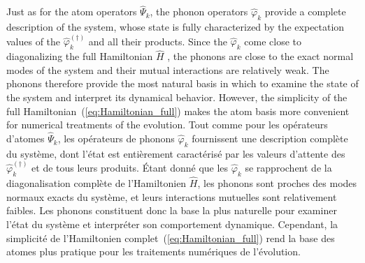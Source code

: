 \documentclass[aps,prd,notitlepage,amsfonts,amssymb,amsmath,nofootinbib,superscriptaddress,longbibliography]{revtex4-2}
\newcommand{\trad}[1]{\textcolor{tradcolor}{#1}}
\begin{document}
Just as for the atom operators $\hat{\Psi}_{k}$, the phonon operators $\hat{\varphi}_{k}$ provide a complete description of the system, whose state is fully characterized by the expectation values of the $\hat{\varphi}_{k}^{(\dagger)}$ and all their products.  Since the $\hat{\varphi}_{k}$ come close to diagonalizing the full Hamiltonian $\hat{H}$ , the phonons are close to the exact normal modes of the system and their mutual interactions are relatively weak.  The phonons therefore provide the most natural basis in which to examine the state of the system and interpret its dynamical behavior.  However, the simplicity of the full Hamiltonian~(\ref{eq:Hamiltonian_full}) makes the atom basis more convenient for numerical treatments of the evolution.
\trad{
Tout comme pour les opérateurs d'atomes $\hat{\Psi}_{k}$, les opérateurs de phonons $\hat{\varphi}_{k}$ fournissent une description complète du système, dont l'état est entièrement caractérisé par les valeurs d'attente des $\hat{\varphi}_{k}^{(\dagger)}$ et de tous leurs produits. Étant donné que les $\hat{\varphi}_{k}$ se rapprochent de la diagonalisation complète de l'Hamiltonien $\hat{H}$, les phonons sont proches des modes normaux exacts du système, et leurs interactions mutuelles sont relativement faibles. Les phonons constituent donc la base la plus naturelle pour examiner l'état du système et interpréter son comportement dynamique. Cependant, la simplicité de l'Hamiltonien complet~(\ref{eq:Hamiltonian_full}) rend la base des atomes plus pratique pour les traitements numériques de l'évolution.\\
}
\end{document}

